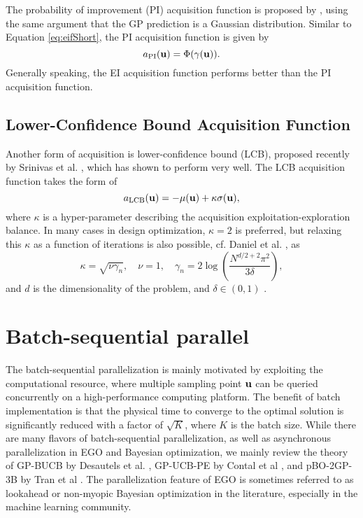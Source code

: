 The probability of improvement (PI) acquisition function is proposed by \cite{kushner1964new}, using the same argument that the GP prediction is a Gaussian distribution. 
Similar to Equation \ref{eq:eifShort}, the PI acquisition function is given by
\begin{equation}
a_{\text{PI}}({\bf u}) = \Phi(\gamma({\bf u})).
\end{equation}
Generally speaking, the EI acquisition function performs better than the PI acquisition function. 

\subsection{Lower-Confidence Bound Acquisition Function} \label{uq:ego:acq:lcb}

Another form of acquisition is lower-confidence bound (LCB), proposed recently by Srinivas et al. \cite{srinivas2009gaussian,srinivas2012information}, which has shown to perform very well. 
The LCB acquisition function takes the form of
\begin{equation}
a_{\text{LCB}}({\bf u}) = - \mu({\bf u}) + \kappa \sigma({\bf u}),
\end{equation}
where $\kappa$ is a hyper-parameter describing the acquisition exploitation-exploration balance. In many cases in design optimization, $\kappa = 2$ is preferred, but relaxing this $\kappa$ as a function of iterations is also possible, cf. Daniel et al. \cite{daniel2014active}, as
\begin{equation}
\kappa = \sqrt{\nu \gamma_n},\quad \nu = 1, \quad \gamma_n = 2\log{\left(\frac{N^{d/2 + 2}\pi^2}{3\delta} \right)},
\end{equation}
and $d$ is the dimensionality of the problem, and $\delta \in (0,1)$ \cite{srinivas2012information}. 

\section{Batch-sequential parallel}

The batch-sequential parallelization is mainly motivated by exploiting the computational resource, where multiple sampling point ${\bf u}$ can be queried concurrently on a high-performance computing platform. 
The benefit of batch implementation is that the physical time to converge to the optimal solution is significantly reduced with a factor of $\sqrt{K}$, where $K$ is the batch size. 
While there are many flavors of batch-sequential parallelization, as well as asynchronous parallelization in EGO and Bayesian optimization, we mainly review the theory of GP-BUCB by Desautels et al. \cite{desautels2014parallelizing}, GP-UCB-PE by Contal et al \cite{contal2013parallel}, and pBO-2GP-3B by Tran et al \cite{tran2019pbo}. 
The parallelization feature of EGO is sometimes referred to as lookahead or non-myopic Bayesian optimization in the literature, especially in the machine learning community. 

